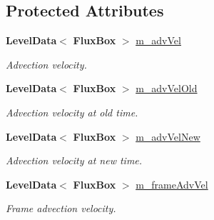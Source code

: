 \subsection*{Protected Attributes}
\begin{DoxyCompactItemize}
\item 
\mbox{\label{class_a_m_r_level_mushy_layer_a1ee4e1a2fc0863bca7550be4e3dcc6c4}} 
\textbf{ Level\+Data}$<$ \textbf{ Flux\+Box} $>$ \hyperlink{class_a_m_r_level_mushy_layer_a1ee4e1a2fc0863bca7550be4e3dcc6c4}{m\+\_\+adv\+Vel}
\begin{DoxyCompactList}\small\item\em Advection velocity. \end{DoxyCompactList}\item 
\mbox{\label{class_a_m_r_level_mushy_layer_af8641fd347befbe1d1d1779102d08f74}} 
\textbf{ Level\+Data}$<$ \textbf{ Flux\+Box} $>$ \hyperlink{class_a_m_r_level_mushy_layer_af8641fd347befbe1d1d1779102d08f74}{m\+\_\+adv\+Vel\+Old}
\begin{DoxyCompactList}\small\item\em Advection velocity at old time. \end{DoxyCompactList}\item 
\mbox{\label{class_a_m_r_level_mushy_layer_a348a74b9d75e95c79ea6a0edd050ab7f}} 
\textbf{ Level\+Data}$<$ \textbf{ Flux\+Box} $>$ \hyperlink{class_a_m_r_level_mushy_layer_a348a74b9d75e95c79ea6a0edd050ab7f}{m\+\_\+adv\+Vel\+New}
\begin{DoxyCompactList}\small\item\em Advection velocity at new time. \end{DoxyCompactList}\item 
\mbox{\label{class_a_m_r_level_mushy_layer_a6faf8aa52dbd4627dce4a2408bac25e7}} 
\textbf{ Level\+Data}$<$ \textbf{ Flux\+Box} $>$ \hyperlink{class_a_m_r_level_mushy_layer_a6faf8aa52dbd4627dce4a2408bac25e7}{m\+\_\+frame\+Adv\+Vel}
\begin{DoxyCompactList}\small\item\em Frame advection velocity. \end{DoxyCompactList}\item 
\mbox{\label{class_a_m_r_level_mushy_layer_a6bba1599c6385bfc52087d65d83e2485}} 

\end{DoxyCompactItemize}
